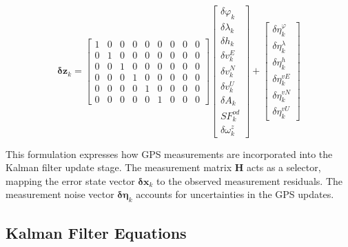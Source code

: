 \documentclass[conference]{IEEEtran}
\begin{document}
\begin{equation}
    \boldsymbol{\delta z}_k =
    \begin{bmatrix}
        1 & 0 & 0 & 0 & 0 & 0 & 0 & 0 & 0 \\
        0 & 1 & 0 & 0 & 0 & 0 & 0 & 0 & 0 \\
        0 & 0 & 1 & 0 & 0 & 0 & 0 & 0 & 0 \\
        0 & 0 & 0 & 1 & 0 & 0 & 0 & 0 & 0 \\
        0 & 0 & 0 & 0 & 1 & 0 & 0 & 0 & 0 \\
        0 & 0 & 0 & 0 & 0 & 1 & 0 & 0 & 0
    \end{bmatrix}
    \begin{bmatrix}
        \delta \varphi_k \\
        \delta \lambda_k \\
        \delta h_k \\
        \delta v_k^E \\
        \delta v_k^N \\
        \delta v_k^U \\
        \delta A_k \\
        SF_k^{od} \\
        \delta \omega_k^z
    \end{bmatrix}
    + 
    \begin{bmatrix}
        \delta \eta_k^\varphi \\
        \delta \eta_k^\lambda \\
        \delta \eta_k^h \\
        \delta \eta_k^{vE} \\
        \delta \eta_k^{vN} \\
        \delta \eta_k^{vU}
    \end{bmatrix}
    \label{eq:measurement_expansion}
\end{equation}

This formulation expresses how GPS measurements are incorporated into the Kalman filter update stage. The measurement matrix $\mathbf{H}$ acts as a selector, mapping the error state vector $\boldsymbol{\delta x}_k$ to the observed measurement residuals. The measurement noise vector $\boldsymbol{\delta \eta}_k$ accounts for uncertainties in the GPS updates.

\subsection{Kalman Filter Equations}
\end{document}
